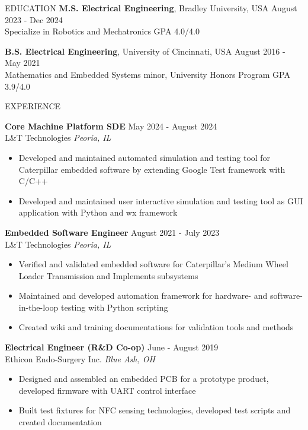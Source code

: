 \documentclass{lib/resume} %
\begin{document}
\begin{rSection}{EDUCATION}
    {\bf M.S. Electrical Engineering}, Bradley University, USA \hfill {August 2023 - Dec 2024} \\
    Specialize in Robotics and Mechatronics \hfill GPA 4.0/4.0 \smallskip

    {\bf B.S. Electrical Engineering}, University of Cincinnati, USA \hfill {August 2016 - May 2021}\\
    Mathematics and Embedded Systems minor, University Honors Program \hfill {GPA 3.9/4.0}
\end{rSection}

\begin{rSection}{EXPERIENCE}

    \textbf{Core Machine Platform SDE} \hfill May 2024 - August 2024 \\
    L\&T Technologies \hfill \textit{Peoria, IL}
    \begin{itemize}
        \itemsep -4pt {}
        \item Developed and maintained automated simulation and testing tool for Caterpillar embedded software by extending Google Test framework with C/C++
        \item Developed and maintained user interactive simulation and testing tool as GUI application with Python and wx framework
    \end{itemize}

    \textbf{Embedded Software Engineer} \hfill August 2021 - July 2023 \\
    L\&T Technologies \hfill \textit{Peoria, IL}
    \begin{itemize}
        \itemsep -4pt {}
        \item Verified and validated embedded software for Caterpillar's Medium Wheel Loader Transmission and Implements subsystems
        \item Maintained and developed automation framework for hardware- and software-in-the-loop testing with Python scripting
        \item Created wiki and training documentations for validation tools and methods
    \end{itemize}

    \textbf{Electrical Engineer (R\&D Co-op)} \hfill June - August 2019\\
    Ethicon Endo-Surgery Inc. \hfill \textit{Blue Ash, OH}
    \begin{itemize}
        \itemsep -4pt {}
        \item Designed and assembled an embedded PCB for a prototype product, developed firmware with UART control interface
        \item Built test fixtures for NFC sensing technologies, developed test scripts and created documentation
    \end{itemize}


\end{rSection}
\end{document}
